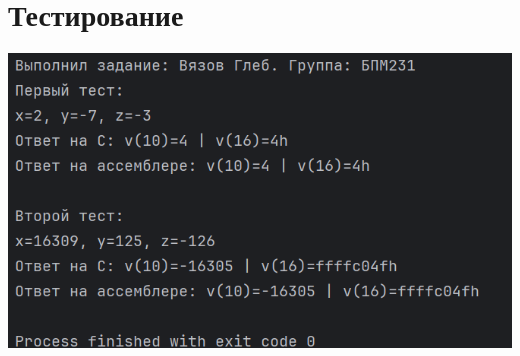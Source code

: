 \documentclass[12pt]{article}
\begin{document}
\section*{Тестирование}

    \includegraphics[width=\linewidth]{img1}
\end{document}
